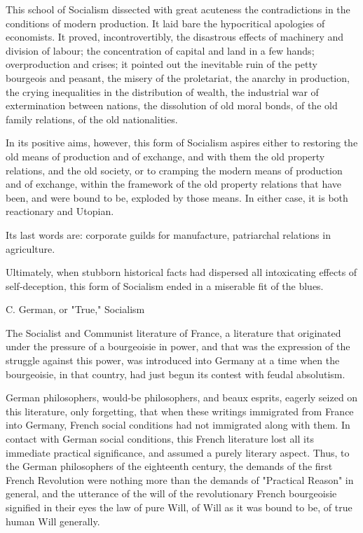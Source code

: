 \documentclass[11pt]{book}
\begin{document}
This school of Socialism dissected with great acuteness the
contradictions in the conditions of modern production.  It laid
bare the hypocritical apologies of economists.  It proved,
incontrovertibly, the disastrous effects of machinery and
division of labour; the concentration of capital and land in a
few hands; overproduction and crises; it pointed out the
inevitable ruin of the petty bourgeois and peasant, the misery
of the proletariat, the anarchy in production, the crying
inequalities in the distribution of wealth, the industrial war of
extermination between nations, the dissolution of old moral
bonds, of the old family relations, of the old nationalities.

In its positive aims, however, this form of Socialism aspires
either to restoring the old means of production and of exchange,
and with them the old property relations, and the old society, or
to cramping the modern means of production and of exchange,
within the framework of the old property relations that have
been, and were bound to be, exploded by those means.  In either
case, it is both reactionary and Utopian.

Its last words are: corporate guilds for manufacture,
patriarchal relations in agriculture.

Ultimately, when stubborn historical facts had dispersed all
intoxicating effects of self-deception, this form of Socialism
ended in a miserable fit of the blues.


C. German, or "True," Socialism

The Socialist and Communist literature of France, a literature
that originated under the pressure of a bourgeoisie in power, and
that was the expression of the struggle against this power, was
introduced into Germany at a time when the bourgeoisie, in that
country, had just begun its contest with feudal absolutism.

German philosophers, would-be philosophers, and beaux esprits,
eagerly seized on this literature, only forgetting, that when
these writings immigrated from France into Germany, French social
conditions had not immigrated along with them.  In contact with
German social conditions, this French literature lost all its
immediate practical significance, and assumed a purely literary
aspect.  Thus, to the German philosophers of the eighteenth
century, the demands of the first French Revolution were nothing
more than the demands of "Practical Reason" in general, and the
utterance of the will of the revolutionary French bourgeoisie
signified in their eyes the law of pure Will, of Will as it was
bound to be, of true human Will generally.
\end{document}
